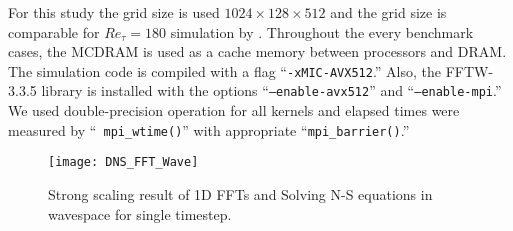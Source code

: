 For this study the grid size is used $1024\times128\times512$ and the
grid size is comparable for $Re_\tau = 180$ simulation by
\cite{Kim:1987ub}. Throughout the every benchmark cases, the MCDRAM is
used as a cache memory between processors and DRAM. The simulation code
is compiled with a flag ``{\tt -xMIC-AVX512}.'' Also, the FFTW-3.3.5
library is installed with the options ``{\tt --enable-avx512}'' and
``{\tt --enable-mpi}.'' \cite{Frigo:2005tu} We used double-precision
operation for all kernels and elapsed times were measured by ``{\tt
mpi\_wtime()}'' with appropriate ``{\tt mpi\_barrier()}.'' 

\begin{figure}
 \begin{center}
   \texttt{[image: DNS\_FFT\_Wave]}
   \caption{Strong scaling result of 1D FFTs and Solving N-S equations in wavespace for single timestep.}
   \label{fig:DNS_strong_scale_fft_wave}
 \end{center}
\end{figure}

